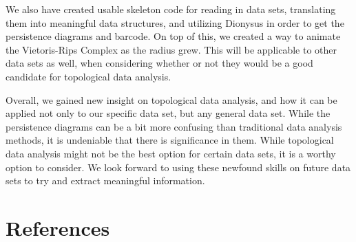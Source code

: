 \documentclass[12pt]{report}
\begin{document}
We also have created usable skeleton code for reading in data sets, translating them into meaningful data structures, and utilizing Dionysus in order to get the persistence diagrams and barcode. On top of this, we created a way to animate the Vietoris-Rips Complex as the radius grew. This will be applicable to other data sets as well, when considering whether or not they would be a good candidate for topological data analysis.\par
Overall, we gained new insight on topological data analysis, and how it can be applied not only to our specific data set, but any general data set. While the persistence diagrams can be a bit more confusing than traditional data analysis methods, it is undeniable that there is significance in them. While topological data analysis might not be the best option for certain data sets, it is a worthy option to consider. We look forward to using these newfound skills on future data sets to try and extract meaningful information.\par
\clearpage
\section*{References}

\clearpage
\end{document}
